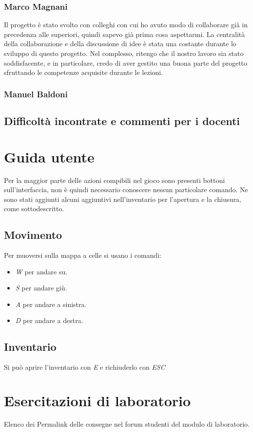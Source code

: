 \documentclass[a4paper,12pt]{report}
\begin{document}
\subsection*{Marco Magnani}
Il progetto è stato svolto con colleghi con cui ho avuto modo di collaborare già in precedenza alle superiori, quindi sapevo già prima cosa aspettarmi. La centralità della collaborazione e della discussione di idee è stata una costante durante lo sviluppo di questo progetto. Nel complesso, ritengo che il nostro lavoro sia stato soddisfacente, e in particolare, credo di aver gestito una buona parte del progetto sfruttando le competenze acquisite durante le lezioni.
\subsection*{Manuel Baldoni}

\section{Difficoltà incontrate e commenti per i docenti}

\appendix
\chapter{Guida utente}
Per la maggior parte delle azioni compibili nel gioco sono presenti bottoni sull'interfaccia, non è quindi necessario conoscere nessun particolare comando. Ne sono stati aggiunti alcuni aggiuntivi nell'inventario per l'apertura e la chiusura, come sottodescritto.
\section{Movimento}
Per muoversi sulla mappa a celle si usano i comandi:
\begin{itemize}
	\item \textit{W} per andare su.
	\item \textit{S} per andare giù.
	\item \textit{A} per andare a sinistra.
	\item \textit{D} per andare a destra.
\end{itemize}
\section{Inventario}
Si può aprire l'inventario con \textit{E} e richiuderlo con \textit{ESC}

\chapter{Esercitazioni di laboratorio}
Elenco dei Permalink delle consegne nel forum studenti del modulo di laboratorio.
\end{document}
